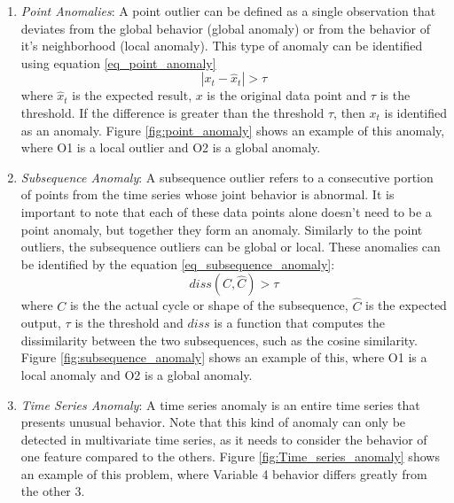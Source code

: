 \begin{enumerate}
    \item \textit{Point Anomalies}: A point outlier can be defined as a single observation that deviates from the global behavior (global anomaly) or from the behavior of it's neighborhood (local anomaly). This type of anomaly can be identified using equation \ref{eq_point_anomaly}
    \begin{equation}
        |x_t - \hat{x}_t| > \tau
        \label{eq_point_anomaly}
    \end{equation}
    where $\hat{x}_t$ is the expected result, $x$ is the original data point and $\tau$ is the threshold. If the difference is greater than the threshold $\tau$, then $x_t$ is identified as an anomaly. Figure \ref{fig:point_anomaly} shows an example of this anomaly, where O1 is a local outlier and O2 is a global anomaly.

    \item \textit{Subsequence Anomaly}: A subsequence outlier refers to a consecutive portion of points from the time series whose joint behavior is abnormal. It is important to note that each of these data points alone doesn't need to be a point anomaly, but together they form an anomaly. Similarly to the point outliers, the subsequence outliers can be global or local. These anomalies can be identified by the equation \ref{eq_subsequence_anomaly}:
    \begin{equation}
        diss\left(C, \hat{C}\right) > \tau
        \label{eq_subsequence_anomaly}
    \end{equation}
    where $C$ is the the actual cycle or shape of the subsequence, $\hat{C}$ is the expected output, $\tau$ is the threshold and $diss$ is a function that computes the dissimilarity between the two subsequences, such as the cosine similarity. Figure \ref{fig:subsequence_anomaly} shows an example of this, where O1 is a local anomaly and O2 is a global anomaly.

    \item \textit{Time Series Anomaly}: A time series anomaly is an entire time series that presents unusual behavior. Note that this kind of anomaly can only be detected in multivariate time series, as it needs to consider the behavior of one feature compared to the others. Figure \ref{fig:Time_series_anomaly} shows an example of this problem, where Variable 4 behavior differs greatly from the other 3.
\end{enumerate}




